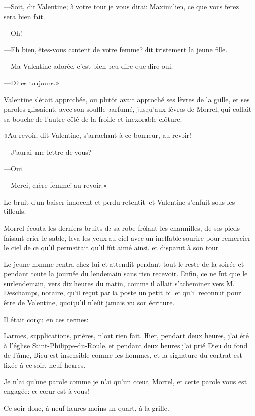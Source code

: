 —Soit, dit Valentine; à votre tour je vous dirai: Maximilien, ce que vous ferez sera bien fait. 

—Oh! 

—Eh bien, êtes-vous content de votre femme? dit tristement la jeune fille. 

—Ma Valentine adorée, c'est bien peu dire que dire oui. 

—Dites toujours.» 

Valentine s'était approchée, ou plutôt avait approché ses lèvres de la grille, et ses paroles glissaient, avec son souffle parfumé, jusqu'aux lèvres de Morrel, qui collait sa bouche de l'autre côté de la froide et inexorable clôture. 

«Au revoir, dit Valentine, s'arrachant à ce bonheur, au revoir! 

—J'aurai une lettre de vous? 

—Oui.  

—Merci, chère femme! au revoir.» 

Le bruit d'un baiser innocent et perdu retentit, et Valentine s'enfuit sous les tilleuls. 

Morrel écouta les derniers bruits de sa robe frôlant les charmilles, de ses pieds faisant crier le sable, leva les yeux au ciel avec un ineffable sourire pour remercier le ciel de ce qu'il permettait qu'il fût aimé ainsi, et disparut à son tour. 

Le jeune homme rentra chez lui et attendit pendant tout le reste de la soirée et pendant toute la journée du lendemain sans rien recevoir. Enfin, ce ne fut que le surlendemain, vers dix heures du matin, comme il allait s'acheminer vers M. Deschamps, notaire, qu'il reçut par la poste un petit billet qu'il reconnut pour être de Valentine, quoiqu'il n'eût jamais vu son écriture. 

Il était conçu en ces termes: 

\begin{mail}{}{}
Larmes, supplications, prières, n'ont rien fait. Hier, pendant deux heures, j'ai été à l'église Saint-Philippe-du-Roule, et pendant deux heures j'ai prié Dieu du fond de l'âme, Dieu est insensible comme les hommes, et la signature du contrat est fixée à ce soir, neuf heures. 

Je n'ai qu'une parole comme je n'ai qu'un cœur, Morrel, et cette parole vous est engagée: ce cœur est à vous! 


Ce soir donc, à neuf heures moins un quart, à la grille.



\end{mail}

